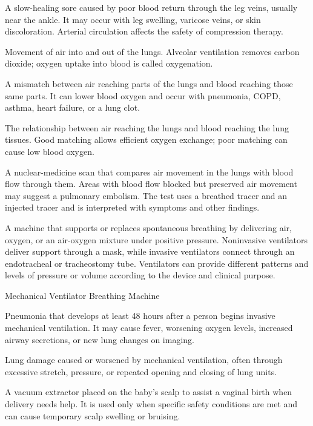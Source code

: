  A slow-healing sore caused by poor blood return through the leg veins, usually near the ankle. It may occur with leg swelling, varicose veins, or skin discoloration. Arterial circulation affects the safety of compression therapy.

 Movement of air into and out of the lungs. Alveolar ventilation removes carbon dioxide; oxygen uptake into blood is called oxygenation.

 A mismatch between air reaching parts of the lungs and blood reaching those same parts. It can lower blood oxygen and occur with pneumonia, COPD, asthma, heart failure, or a lung clot.

 The relationship between air reaching the lungs and blood reaching the lung tissues. Good matching allows efficient oxygen exchange; poor matching can cause low blood oxygen.

 A nuclear-medicine scan that compares air movement in the lungs with blood flow through them. Areas with blood flow blocked but preserved air movement may suggest a pulmonary embolism. The test uses a breathed tracer and an injected tracer and is interpreted with symptoms and other findings.

 A machine that supports or replaces spontaneous breathing by delivering air, oxygen, or an air-oxygen mixture under positive pressure. Noninvasive ventilators deliver support through a mask, while invasive ventilators connect through an endotracheal or tracheostomy tube. Ventilators can provide different patterns and levels of pressure or volume according to the device and clinical purpose.

\synonyms
Mechanical Ventilator
Breathing Machine

 Pneumonia that develops at least 48 hours after a person begins invasive mechanical ventilation. It may cause fever, worsening oxygen levels, increased airway secretions, or new lung changes on imaging.

 Lung damage caused or worsened by mechanical ventilation, often through excessive stretch, pressure, or repeated opening and closing of lung units.

 A vacuum extractor placed on the baby's scalp to assist a vaginal birth when delivery needs help. It is used only when specific safety conditions are met and can cause temporary scalp swelling or bruising.

